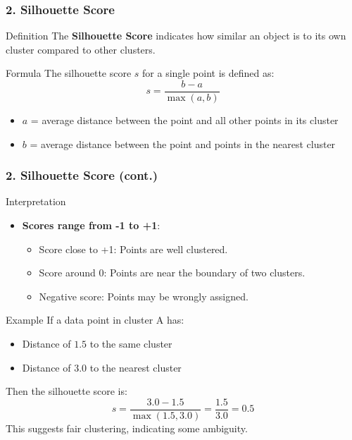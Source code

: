 \documentclass[aspectratio=169]{beamer}
\begin{document}
\begin{frame}[fragile]
    \frametitle{2. Silhouette Score}
    \begin{block}{Definition}
        The \textbf{Silhouette Score} indicates how similar an object is to its own cluster compared to other clusters.
    \end{block}

    \begin{block}{Formula}
        The silhouette score \(s\) for a single point is defined as:
        \begin{equation}
        s = \frac{b - a}{\max(a, b)}
        \end{equation}
        \begin{itemize}
            \item \(a\) = average distance between the point and all other points in its cluster
            \item \(b\) = average distance between the point and points in the nearest cluster
        \end{itemize}
    \end{block}
\end{frame}

\begin{frame}[fragile]
    \frametitle{2. Silhouette Score (cont.)}
    \begin{block}{Interpretation}
        \begin{itemize}
            \item \textbf{Scores range from -1 to +1}:
                \begin{itemize}
                    \item Score close to +1: Points are well clustered.
                    \item Score around 0: Points are near the boundary of two clusters.
                    \item Negative score: Points may be wrongly assigned.
                \end{itemize}
        \end{itemize}
    \end{block}

    \begin{block}{Example}
        If a data point in cluster A has:
        \begin{itemize}
            \item Distance of \(1.5\) to the same cluster
            \item Distance of \(3.0\) to the nearest cluster
        \end{itemize}
        Then the silhouette score is:
        \begin{equation}
        s = \frac{3.0 - 1.5}{\max(1.5, 3.0)} = \frac{1.5}{3.0} = 0.5
        \end{equation}
        This suggests fair clustering, indicating some ambiguity.
    \end{block}
\end{frame}
\end{document}
